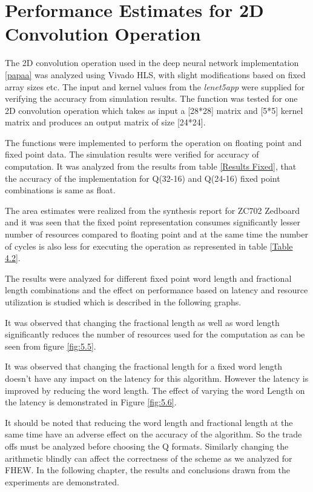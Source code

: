 \section{Performance Estimates for 2D Convolution Operation}
The 2D convolution operation used in the deep neural network implementation \ref{papaa} was analyzed using Vivado HLS, with slight modifications based on fixed array sizes etc.
The input and kernel values from the \textit{lenet5app} were supplied for verifying the accuracy from simulation results. The function was tested for one 2D convolution operation which takes as input a [28*28] matrix and [5*5] kernel matrix and produces an output matrix of size [24*24].

\noindent The functions were implemented to perform the operation on floating point and fixed point data. The simulation results were verified for accuracy of computation. It was analyzed from the results from table \ref{Results Fixed}, that the accuracy of the implementation for Q(32-16) and Q(24-16) fixed point combinations is same as float.

\noindent The area estimates were realized from the synthesis report for ZC702 Zedboard and it was seen that the fixed point representation consumes significantly lesser number of resources compared to floating point and at the same time the number of cycles is also less for executing the operation as represented in table \ref{Table 4.2}.


\noindent The results were analyzed for different fixed point word length and fractional length combinations and the effect on performance based on latency and resource utilization is studied which is described in the following graphs.



\noindent It was observed that changing the fractional length as well as word length significantly reduces the number of resources used for the computation as can be seen from figure \ref{fig:5.5}.


\noindent It was observed that changing the fractional length for a fixed word length doesn't have any impact on the latency for this algorithm. However the latency is improved by reducing the word length. The effect of varying the word Length on the latency is demonstrated in Figure \ref{fig:5.6}.

\noindent It should be noted that reducing the word length and fractional length at the same time have an adverse effect on the accuracy of the algorithm. So the trade offs must be analyzed before choosing the Q formats. Similarly changing the arithmetic blindly can affect the correctness of the scheme as we analyzed for FHEW. In the following chapter, the results and conclusions drawn from the experiments are demonstrated. 